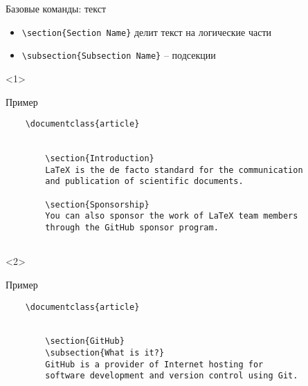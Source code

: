 
\begin{frame}[fragile]{Базовые команды: текст}

\begin{itemize}[<+->]
    \item \lstinline!\section{Section Name}! делит текст на логические части
    \item \lstinline!\subsection{Subsection Name}! -- подсекции
\end{itemize}

\begin{onlyenv}<1>
    \begin{block}{Пример}
        \begin{lstlisting}
    \documentclass{article}
    
    
        \section{Introduction}
        LaTeX is the de facto standard for the communication 
        and publication of scientific documents.
        
        \section{Sponsorship}
        You can also sponsor the work of LaTeX team members 
        through the GitHub sponsor program.
    
        \end{lstlisting}
    \end{block}
\end{onlyenv}

\begin{onlyenv}<2>
    \begin{block}{Пример}
        \begin{lstlisting}
    \documentclass{article}
    
    
        \section{GitHub}
        \subsection{What is it?}
        GitHub is a provider of Internet hosting for 
        software development and version control using Git.
        

\end{lstlisting}
\end{block}
\end{onlyenv}
\end{frame}
